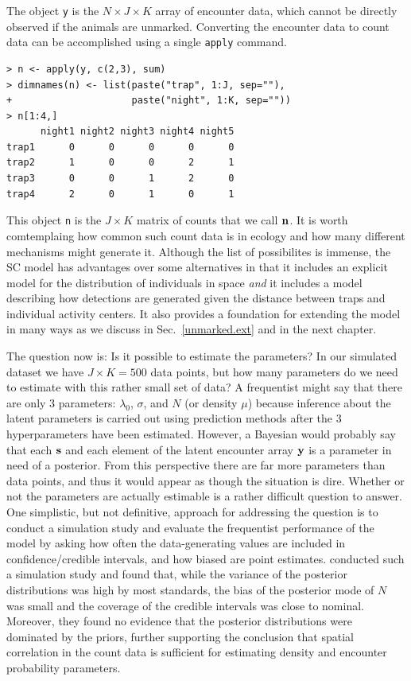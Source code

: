 The object \verb+y+ is the $N \times J \times K$ array of encounter
data, which cannot be directly observed if the animals are unmarked.
Converting the encounter data to count data can be accomplished using a single
\verb+apply+ command.
\begin{small}
\begin{verbatim}
> n <- apply(y, c(2,3), sum)
> dimnames(n) <- list(paste("trap", 1:J, sep=""),
+                     paste("night", 1:K, sep=""))
> n[1:4,]
      night1 night2 night3 night4 night5
trap1      0      0      0      0      0
trap2      1      0      0      2      1
trap3      0      0      1      2      0
trap4      2      0      1      0      1
\end{verbatim}
\end{small}
This object \verb+n+ is the $J \times K$ matrix of counts that we call
$\bf n$. It is worth comtemplaing how common such count data is in
ecology and how many different mechanisms might generate it. Although
the list of possibilites is immense, the SC model has advantages over
some alternatives
in that it includes an explicit
model for the distribution of individuals in space \textit{and} it
includes a model describing how detections are generated given the
distance between traps and individual activity centers. It also
provides a foundation for extending the model in many ways as we
discuss in Sec.~\ref{unmarked.ext} and in the next chapter.

The question now is: Is it possible to estimate the parameters? In our
simulated dataset we have $J \times K = 500$ data points, but how many
parameters do we need to estimate with this rather small set of data?
A frequentist might say that there are only 3 parameters: $\lambda_0$,
$\sigma$, and $N$ (or density $\mu$) because inference about the
latent parameters is carried out using prediction methods after the 3
hyperparameters have been estimated. However, a Bayesian would
probably say that each $\bf s$ and each element of the latent
encounter array $\bf y$ is a parameter in need of a posterior. From
this perspective there are far more parameters than data points, and
thus it would appear as though the situation is dire. Whether or not
the parameters are actually estimable is a rather difficult question
to answer. One simplistic, but not definitive, approach for addressing
the question is to conduct a simulation study and evaluate the
frequentist performance of the model by asking how often the
data-generating values are included in confidence/credible intervals,
and how biased are point estimates. \citet{chandler_royle:2012}
conducted such a simulation study and found that, while the variance
of the posterior distributions was high by most standards, the bias of
the posterior mode of $N$ was small and the coverage of the credible
intervals was close to nominal. Moreover, they found no evidence that the
posterior distributions were dominated by the priors, further
supporting the conclusion that spatial correlation in the count data
is sufficient for estimating density and encounter probability
parameters. %

